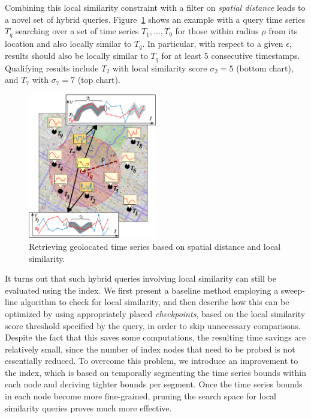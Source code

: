 Combining this local similarity constraint with a filter on {\em spatial distance} leads to a novel set of hybrid queries. Figure~\ref{fig:example_query} shows an example with a query time series $T_q$ searching over a set of time series $T_1,\dots,T_9$ for those within radius $\rho$ from its location and also locally similar to $T_q$. In particular, with respect to a given $\epsilon$, results should also be locally similar to $T_q$ for at least 5 consecutive timestamps. Qualifying results include $T_2$ with local similarity score $\sigma_2 = 5$ (bottom chart), and $T_7$ with $\sigma_7 = 7$ (top chart).

\begin{figure}[!t]
 \centering
 \includegraphics[width=0.5\textwidth]{Figures/local_sim_geoloc.png}
\caption{Retrieving geolocated time series based on spatial distance and local similarity.}
\label{fig:example_query}
\end{figure}

It turns out that such hybrid queries involving local similarity can still be evaluated using the \btsr index. We first present a baseline method employing a sweep-line algorithm to check for local similarity, and then describe how this can be optimized by using appropriately placed {\em checkpoints}, based on the local similarity score threshold specified by the query, in order to skip unnecessary comparisons. Despite the fact that this saves some computations, the resulting time savings are relatively small, since the number of index nodes that need to be probed is not essentially reduced. To overcome this problem, we introduce an improvement to the \btsr index, which is based on temporally segmenting the time series bounds within each node and deriving tighter bounds per segment. Once the time series bounds in each node become more fine-grained, pruning the search space for local similarity queries proves much more effective.


